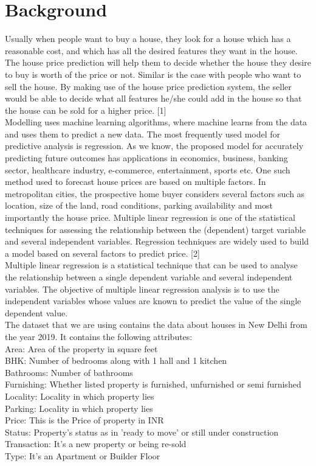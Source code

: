 \section{Background}\label{sec:bkgrnd}%
Usually when people want to buy a house, they look for a house which has a reasonable cost, and which has all the desired features they want in the house. The house price prediction will help them to decide whether the house they desire to buy is worth of the price or not. Similar is the case with people who want to sell the house. By making use of the house price prediction system, the seller would be able to decide what all features he/she could add in the house so that the house can be sold for a higher price. [1] \\
Modelling uses machine learning algorithms, where machine learns from the data and uses them to predict a new data. The most frequently used model for predictive analysis is regression. As we know, the proposed model for accurately predicting future outcomes has applications in economics, business, banking sector, healthcare industry, e-commerce, entertainment, sports etc. One such method used to forecast house prices are based on multiple factors. In metropolitan cities, the prospective home buyer considers several factors such as location, size of the land, road conditions, parking availability and most importantly the house price. Multiple linear regression is one of the statistical techniques for assessing the relationship between the (dependent) target variable and several independent variables. Regression techniques are widely used to build a model based on several factors to predict price. [2]\\
Multiple linear regression is a statistical technique that can be used to analyse the relationship between a single dependent variable and several independent variables. The objective of multiple linear regression analysis is to use the independent variables whose values are known to predict the value of the single dependent value.\\
The dataset that we are using contains the data about houses in New Delhi from the year 2019. It contains the following attributes:\\
Area: Area of the property in square feet\\
BHK: Number of bedrooms along with 1 hall and 1 kitchen\\
Bathrooms: Number of bathrooms\\
Furnishing: Whether listed property is furnished, unfurnished or semi furnished\\
Locality: Locality in which property lies\\
Parking: Locality in which property lies\\
Price: This is the Price of property in INR\\
Status: Property's status as in 'ready to move' or still under construction\\
Transaction: It’s a new property or being re-sold\\
Type: It’s an Apartment or Builder Floor
